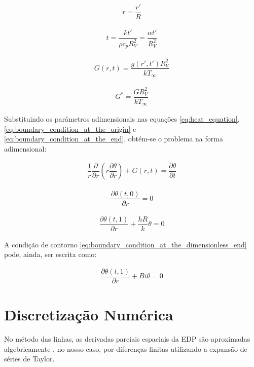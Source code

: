\begin{gather}
    r = \dfrac{r '}{R}
\end{gather}

\begin{gather}
    t = \dfrac{k t'}{\rho c _p R_{V}^{2}} = \dfrac{\alpha t'}{R_{V}^{2}}
\end{gather}

\begin{gather}
    G (r, t) = \dfrac{g(r' , t') R_{V}^{2}}{k T _\infty}
\end{gather}

\begin{gather}
    G ^* = \dfrac{G R_{V}^{2}}{k T_ \infty}
\end{gather}

Substituindo os parâmetros adimensionais nas equações \ref{eq:heat_equation}, \ref{eq:boundary_condition_at_the_origin} e \ref{eq:boundary_condition_at_the_end}, obtém-se o problema na forma adimensional:

\begin{gather}
    \dfrac{1}{r} \dfrac{\partial}{\partial r} \left(r \dfrac{\partial \theta}{\partial r} \right) + G (r , t) = \dfrac{\partial \theta}{\partial t}
    \label{eq:dimensionless_heat_equation}
\end{gather}

\begin{gather}
    \dfrac{\partial \theta (t , 0)}{\partial r} = 0
    \label{eq:boundary_condition_at_dimensionless_origin}
\end{gather}

\begin{gather}
    \dfrac{\partial \theta (t , 1)}{\partial r} + \dfrac{h R}{k} \theta = 0
    \label{eq:boundary_condition_at_the_dimensionless_end}
\end{gather}

A condição de contorno \ref{eq:boundary_condition_at_the_dimensionless_end} pode, ainda, ser escrita como:

\begin{gather}
    \dfrac{\partial \theta (t , 1)}{\partial r} + Bi \theta = 0
    \label{eq:boundary_condition_at_the_manipulated_dimensionless_end}
\end{gather}

\section{Discretização Numérica} 

No método das linhas, as derivadas parciais espaciais da EDP são aproximadas algebricamente \citep{schiesser2009}, no nosso caso, por diferenças finitas utilizando a expansão de séries de Taylor. 

